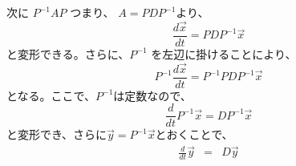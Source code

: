 \documentclass[dvipdfmx,uplatex]{jsarticle}
\begin{document}
\begin{spacing}{1.6}
\begin{qparts}
  次に $ P^{-1}AP $ つまり、 $ A = PDP^{-1} $より、
  \begin{equation*}
    \frac{d \overrightarrow{x}}{dt} = PDP^{-1} \overrightarrow x
  \end{equation*}
  と変形できる。さらに、$ P^{-1} $ を左辺に掛けることにより、
  \begin{equation*}
    P^{-1}\frac{d \overrightarrow{x}}{dt} = P^{-1}PDP^{-1}\overrightarrow x
  \end{equation*}
  となる。ここで、$P^{-1}$は定数なので、
  \begin{equation*}
    \frac{d}{dt}P^{-1}\overrightarrow x = DP^{-1}\overrightarrow x
  \end{equation*}
  と変形でき、さらに$\overrightarrow y = P^{-1}\overrightarrow x$とおくことで、
  \begin{eqnarray*}
    \frac{d}{dt}\overrightarrow y & = & D \overrightarrow y \\
  \end{eqnarray*}
  \newpage


\end{qparts}
\end{spacing}
\end{document}
